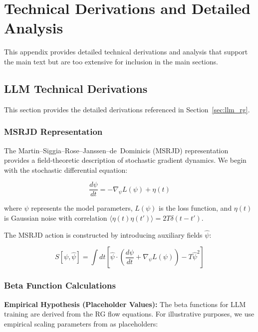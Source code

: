 \section{Technical Derivations and Detailed Analysis}
\label{app:technical-derivations}

This appendix provides detailed technical derivations and analysis that support the main text but are too extensive for inclusion in the main sections.

\subsection{LLM Technical Derivations}
\label{app:llm-technical-derivations}

This section provides the detailed derivations referenced in Section~\ref{sec:llm_rg}.

\subsubsection{MSRJD Representation}

The Martin--Siggia--Rose--Janssen--de~Dominicis (MSRJD) representation \cite{martin1973,janssen1976,dedominicis1976} provides a field-theoretic description of stochastic gradient dynamics. We begin with the stochastic differential equation:

\begin{equation}
\frac{d\psi}{dt} = -\nabla_\psi L(\psi) + \eta(t)
\label{eq:stochastic-gradient}
\end{equation}

where $\psi$ represents the model parameters, $L(\psi)$ is the loss function, and $\eta(t)$ is Gaussian noise with correlation $\langle \eta(t) \eta(t') \rangle = 2T \delta(t-t')$.

The MSRJD action is constructed by introducing auxiliary fields $\hat{\psi}$:

\begin{equation}
S[\psi, \hat{\psi}] = \int dt \left[ \hat{\psi} \cdot \left( \frac{d\psi}{dt} + \nabla_\psi L(\psi) \right) - T \hat{\psi}^2 \right]
\label{eq:msrjd-action}
\end{equation}

\subsubsection{Beta Function Calculations}

\textbf{Empirical Hypothesis (Placeholder Values):} The beta functions for LLM training are derived from the RG flow equations. For illustrative purposes, we use empirical scaling parameters from \cite{kaplan2020,hoffmann2022} as placeholders:


